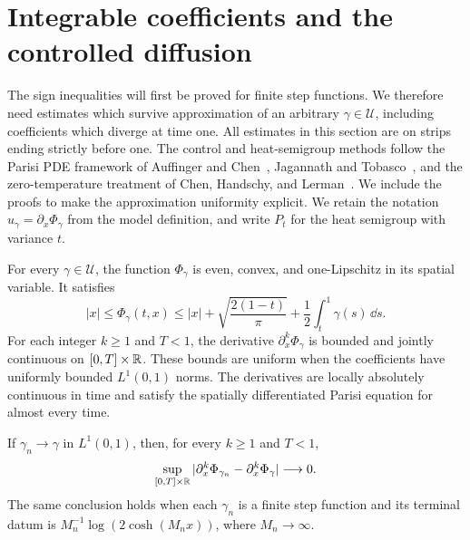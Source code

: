 \section{Integrable coefficients and the controlled diffusion}
\label{sec:regularity}

The sign inequalities will first be proved for finite step functions.  We
therefore need estimates which survive approximation of an arbitrary
$\gamma\in\mathcal U$, including coefficients which diverge at time one.
All estimates in this section are on strips ending strictly before one.
The control and heat-semigroup methods follow the Parisi PDE framework of
Auffinger and Chen~\cite{AC2015}, Jagannath and Tobasco~\cite{JT2016},
and the zero-temperature treatment of Chen, Handschy, and
Lerman~\cite[Proposition~2 and Theorem~5]{CHL2018}.
We include the proofs to make the approximation uniformity explicit.
We retain the notation $u_\gamma=\partial_x\Phi_\gamma$ from the model
definition, and write $P_t$ for the heat semigroup with variance $t$.

\begin{lemma}
\label{lem:regularity}
For every $\gamma\in\mathcal U$, the function $\Phi_\gamma$ is even,
convex, and one-Lipschitz in its spatial variable.  It satisfies
\begin{equation}
 |x|\leq\Phi_\gamma(t,x)
 \leq |x|+\sqrt{\frac{2(1-t)}\pi}
               +\frac12\int_t^1\gamma(s)\,\dd s.
 \label{eq:terminal-uniform}
\end{equation}
For each integer $k\geq1$ and $T<1$, the derivative
$\partial_x^k\Phi_\gamma$ is bounded and jointly continuous on
$[0,T]\times\mathbb R$.  These bounds are uniform when the coefficients have
uniformly bounded $L^1(0,1)$ norms.  The derivatives are locally
absolutely continuous in time and satisfy the spatially differentiated
Parisi equation for almost every time.

If $\gamma_n\to\gamma$ in $L^1(0,1)$, then, for every $k\geq1$ and
$T<1$,
\begin{equation}
 \sup_{[0,T]\times\mathbb R}
 |\partial_x^k\Phi_{\gamma_n}-\partial_x^k\Phi_\gamma|
 \longrightarrow0.
 \label{eq:derivative-convergence}
\end{equation}
The same conclusion holds when each $\gamma_n$ is a finite step
function and its terminal datum is
$M_n^{-1}\log(2\cosh(M_nx))$, where $M_n\to\infty$.
\end{lemma}

